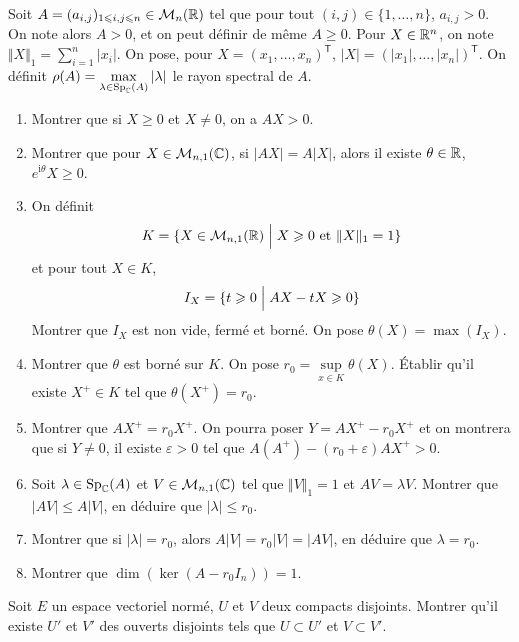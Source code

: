 \begin{exercise}
	Soit $A=(a_{i,j})_{1\leqslant i,j\leqslant n}\in\mathcal{M}_{n}(\mathbb{R})$ tel que pour tout $(i,j)\in\{1,\dots,n\}$, $a_{i,j}>0$. On note alors $A>0$, et on peut définir de même $A\geqslant0$. Pour $X\in\mathbb{R}^{n}$, on note $\Vert X\Vert_{1}=\sum_{i=1}^{n}\vert x_{i}\vert$. On pose, pour $X=(x_{1},\dots,x_{n})^{\mathsf{T}}$, $\vert X\vert=(\vert x_{1}\vert,\dots,\vert x_{n}\vert)^{\mathsf{T}}$. 
	On définit $\rho(A)=\max\limits_{\lambda\in\operatorname{Sp}_{\mathbb{C}}(A)}\vert\lambda\vert$ le rayon spectral de $A$.
	\begin{enumerate}
		\item Montrer que si $X\geqslant0$ et $X\neq0$, on a $AX>0$.
		\item Montrer que pour $X\in\mathcal{M}_{n,1}(\mathbb{C})$, si $\vert AX\vert=A\vert X\vert$, alors il existe $\theta\in\mathbb{R}$, $e^{\mathrm{i}\theta}X\geqslant0$.
		\item On définit 
		$$K=\{X\in\mathcal{M}_{n,1}(\mathbb{R})\Bigm| X\geqslant0\text{ et }\Vert X\Vert_{1}=1\}$$
		et pour tout $X\in K$, 
		$$I_{X}=\{t\geqslant0\Bigm|AX-tX\geqslant0\}$$
		Montrer que $I_{X}$ est non vide, fermé et borné. On pose $\theta(X)=\max(I_{X})$.
		\item Montrer que $\theta$ est borné sur $K$. On pose $r_{0}=\sup\limits_{x\in K}\theta(X)$. Établir qu'il existe $X^{+}\in K$ tel que $\theta(X^{+})=r_{0}$.
		\item Montrer que $AX^{+}=r_{0}X^{+}$. On pourra poser $Y=AX^{+}-r_{0}X^{+}$ et on montrera que si $Y\neq0$, il existe $\varepsilon>0$ tel que $A(A^{+})-(r_{0}+\varepsilon)AX^{+}>0$.
		\item Soit $\lambda\in\operatorname{Sp}_{\mathbb{C}}(A)$ et $V\in\mathcal{M}_{n,1}(\mathbb{C})$ tel que $\Vert V\Vert_{1}=1$ et $AV=\lambda V$. Montrer que $\vert AV\vert\leqslant A\vert V\vert$, en déduire que $\vert\lambda\vert\leqslant r_{0}$.
		\item Montrer que si $\vert\lambda\vert=r_{0}$, alors $A\vert V\vert=r_{0}\vert V\vert=\vert AV\vert$, en déduire que $\lambda=r_{0}$.
		\item Montrer que $\dim(\ker(A-r_{0}I_{n}))=1$.
	\end{enumerate}
\end{exercise}

\begin{exercise}
	Soit $E$ un espace vectoriel normé, $U$ et $V$ deux compacts disjoints. Montrer qu'il existe $U'$ et $V'$ des ouverts disjoints tels que $U\subset U'$ et $V\subset V'$.
\end{exercise}

